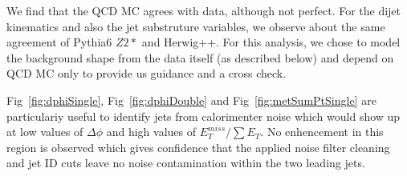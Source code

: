 \newpage


We find that the QCD MC agrees with data, although not perfect.
For the dijet kinematics and also the jet substruture variables, we observe about the same agreement of Pythia6 $Z2*$ and Herwig++. 
For this analysis, we chose to model the background shape from the data itself
(as described below)
and depend on QCD MC only to provide us guidance and a cross check.

Fig~\ref{fig:dphiSingle}, Fig~\ref{fig:dphiDouble} and Fig~\ref{fig:metSumPtSingle} are particulariy useful to identify jets from calorimenter noise which would show up at low values of $\Delta\phi$ and high values of $E_{T}^{miss}/\sum E_{T}$. No enhencement in this region is observed which gives confidence that the applied noise filter cleaning and jet ID cuts leave no noise contamination within the two leading jets.




